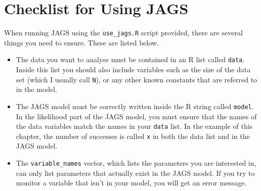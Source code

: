 \section{Checklist for Using JAGS}
When running JAGS using the {\tt use\_jags.R} script provided, there are several
things you need to ensure. These are listed below.

\begin{itemize}
\item The data you want to analyse must be contained in an R
list called {\tt data}. Inside this list you should also include variables
such as the size of the data set (which I usually call {\tt N}),
or any other known constants that are
referred to in the model.
\item The JAGS model must be correctly written inside the R string called
{\tt model}. In the likelihood part of the JAGS model, you must ensure that
the names of the data variables match the names in your {\tt data} list. In
the example of this chapter, the number of successes is called {\tt x} in both
the data list and in the JAGS model.
\item The {\tt variable\_names} vector, which lists the parameters you are
interested in, can only list parameters that actually exist in the JAGS model.
If you try to monitor a variable that isn't in your model, you will get an
error message.
\end{itemize}
